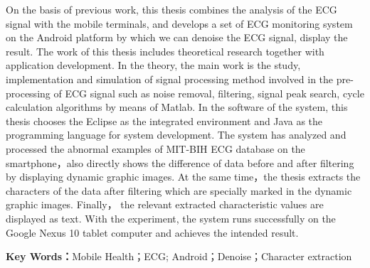On the basis of previous work, this thesis combines the analysis of the ECG signal with
the mobile terminals, and develops a set of ECG monitoring system on the Android platform
by which we can denoise the ECG signal, display the result. The work of this thesis includes
theoretical research together with application development. In the theory, the main work is the
study, implementation and simulation of signal processing method involved in the
pre-processing of ECG signal such as noise removal, filtering, signal peak search, cycle
calculation algorithms by means of Matlab. In the software of the system, this thesis chooses
the Eclipse as the integrated environment and Java as the programming language for system
development. The system has analyzed and processed the abnormal examples of MIT-BIH
ECG database on the smartphone，also directly shows the difference of data before and after
filtering by displaying dynamic graphic images. At the same time，the thesis extracts the
characters of the data after filtering which are specially marked in the dynamic graphic
images. Finally， the relevant extracted characteristic values are displayed as text. With the
experiment, the system runs successfully on the Google Nexus 10 tablet computer and
achieves the intended result.

\textbf{Key Words：}Mobile Health；ECG; Android；Denoise；Character extraction
